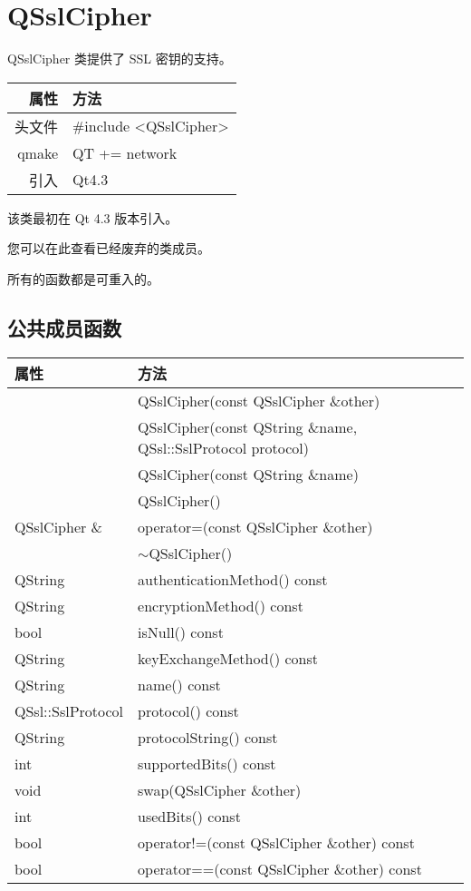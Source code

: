 \chapter{QSslCipher}

QSslCipher 类提供了 SSL 密钥的支持。

\begin{tabular}{|r|l|}
	\hline
	属性 & 方法 \\
	\hline
	头文件 & \#include <QSslCipher>\\      
	\hline
	qmake & QT += network\\      
	\hline
	引入 &	Qt4.3 \\ 
	\hline
\end{tabular}

该类最初在 Qt 4.3 版本引入。

您可以在此查看已经废弃的类成员。

\begin{notice}
所有的函数都是可重入的。
\end{notice}

\section{公共成员函数}

\begin{longtable}[l]{|m{19em}|m{24em}|}
\hline 
属性 &	方法\\ 
\hline 
 &QSslCipher(const QSslCipher \&other) \\ 
 \hline
&	QSslCipher(const QString \&name, QSsl::SslProtocol protocol) \\
\hline
&	QSslCipher(const QString \&name) \\
\hline
&	QSslCipher() \\ 
	\hline
QSslCipher \& &	operator=(const QSslCipher \&other) \\ 
\hline
& $\sim$QSslCipher() \\ 
	\hline
QString &	authenticationMethod() const \\ 
\hline
QString &	encryptionMethod() const \\ 
\hline
bool &	isNull() const \\ 
\hline
QString &	keyExchangeMethod() const \\ 
\hline
QString &	name() const \\ 
\hline
QSsl::SslProtocol &	protocol() const \\ 
\hline
QString &	protocolString() const \\ 
\hline
int 	&supportedBits() const \\ 
\hline
void 	&swap(QSslCipher \&other) \\ 
\hline
int 	&usedBits() const \\ 
\hline
bool 	&operator!=(const QSslCipher \&other) const \\ 
\hline
bool 	&operator==(const QSslCipher \&other) const \\ 
\hline 
\end{longtable}

